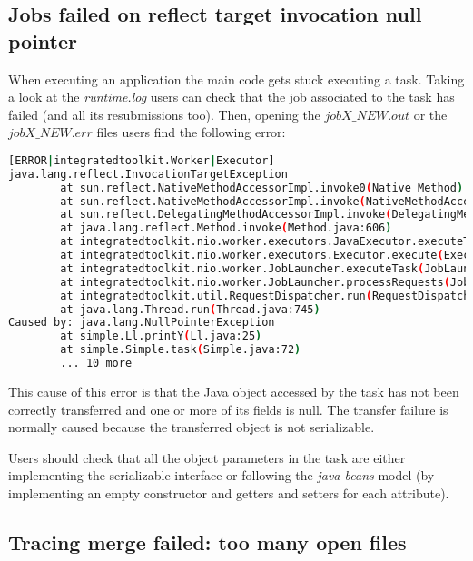 \subsection{Jobs failed on reflect target invocation null pointer}
When executing an application the main code gets stuck executing a task. Taking a look at the \textit{runtime.log} users can check
that the job associated to the task has failed (and all its resubmissions too). Then, opening the \textit{$jobX\_NEW.out$} or the
\textit{$jobX\_NEW.err$} files users find the following error:

\begin{lstlisting}[language=bash]
[ERROR|integratedtoolkit.Worker|Executor]
java.lang.reflect.InvocationTargetException
        at sun.reflect.NativeMethodAccessorImpl.invoke0(Native Method)
        at sun.reflect.NativeMethodAccessorImpl.invoke(NativeMethodAccessorImpl.java:57)
        at sun.reflect.DelegatingMethodAccessorImpl.invoke(DelegatingMethodAccessorImpl.java:43)
        at java.lang.reflect.Method.invoke(Method.java:606)
        at integratedtoolkit.nio.worker.executors.JavaExecutor.executeTask(JavaExecutor.java:154)
        at integratedtoolkit.nio.worker.executors.Executor.execute(Executor.java:42)
        at integratedtoolkit.nio.worker.JobLauncher.executeTask(JobLauncher.java:46)
        at integratedtoolkit.nio.worker.JobLauncher.processRequests(JobLauncher.java:34)
        at integratedtoolkit.util.RequestDispatcher.run(RequestDispatcher.java:46)
        at java.lang.Thread.run(Thread.java:745)
Caused by: java.lang.NullPointerException
        at simple.Ll.printY(Ll.java:25)
        at simple.Simple.task(Simple.java:72)
        ... 10 more
\end{lstlisting}

This cause of this error is that the Java object accessed by the task has not been correctly transferred and one or more of its fields
is null. The transfer failure is normally caused because the transferred object is not serializable. 

Users should check that all the object parameters in the task are either implementing the serializable interface or following 
the \textit{java beans} model (by implementing an empty constructor and getters and setters for each attribute).

\subsection{Tracing merge failed: too many open files}

